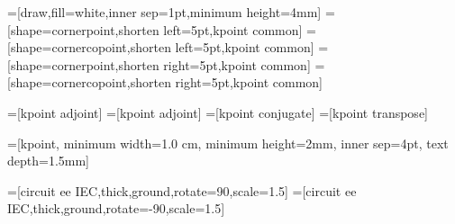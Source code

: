 
\makeatother




=[draw,fill=white,inner sep=1pt,minimum height=4mm]
=[shape=cornerpoint,shorten left=5pt,kpoint common]
=[shape=cornercopoint,shorten left=5pt,kpoint common]
=[shape=cornerpoint,shorten right=5pt,kpoint common]
=[shape=cornercopoint,shorten right=5pt,kpoint common]

=[kpoint adjoint]
=[kpoint adjoint]
=[kpoint conjugate]
=[kpoint transpose]

=[kpoint, minimum width=1.0 cm, minimum height=2mm, inner sep=4pt, text depth=1.5mm]

 =[circuit ee IEC,thick,ground,rotate=90,scale=1.5]
 =[circuit ee IEC,thick,ground,rotate=-90,scale=1.5]


